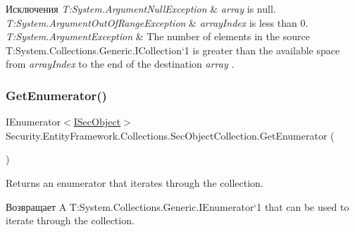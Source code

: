\begin{DoxyExceptions}{Исключения}
{\em T\+:\+System.\+Argument\+Null\+Exception} & {\itshape array}  is null.\\
\hline
{\em T\+:\+System.\+Argument\+Out\+Of\+Range\+Exception} & {\itshape array\+Index}  is less than 0.\\
\hline
{\em T\+:\+System.\+Argument\+Exception} & The number of elements in the source T\+:\+System.\+Collections.\+Generic.\+I\+Collection`1 is greater than the available space from {\itshape array\+Index}  to the end of the destination {\itshape array} .\\
\hline
\end{DoxyExceptions}
\mbox{\label{class_security_1_1_entity_framework_1_1_collections_1_1_sec_object_collection_ac4b5538f96293498e05e7c3a0c91ffcd}} 
\subsubsection{\texorpdfstring{Get\+Enumerator()}{GetEnumerator()}}
{\footnotesize\ttfamily I\+Enumerator$<$\hyperlink{interface_security_1_1_interfaces_1_1_model_1_1_i_sec_object}{I\+Sec\+Object}$>$ Security.\+Entity\+Framework.\+Collections.\+Sec\+Object\+Collection.\+Get\+Enumerator (\begin{DoxyParamCaption}{ }\end{DoxyParamCaption})}



Returns an enumerator that iterates through the collection. 

\begin{DoxyReturn}{Возвращает}
A T\+:\+System.\+Collections.\+Generic.\+I\+Enumerator`1 that can be used to iterate through the collection. 
\end{DoxyReturn}
\mbox{\label{class_security_1_1_entity_framework_1_1_collections_1_1_sec_object_collection_aed554f3f59ee008059b0d403bd620c89}} 
